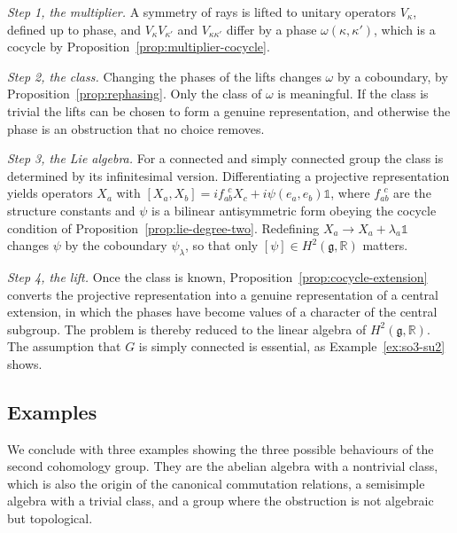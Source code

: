 \begin{remark}\label{rem:bargmann-reading}
	\emph{Step 1, the multiplier.} A symmetry of rays is lifted to unitary operators $V_\kappa$, defined up to phase, and $V_\kappa V_{\kappa'}$ and $V_{\kappa\kappa'}$ differ by a phase $\omega(\kappa,\kappa')$, which is a cocycle by Proposition~\ref{prop:multiplier-cocycle}.
	
	\emph{Step 2, the class.} Changing the phases of the lifts changes $\omega$ by a coboundary, by Proposition~\ref{prop:rephasing}. Only the class of $\omega$ is meaningful. If the class is trivial the lifts can be chosen to form a genuine representation, and otherwise the phase is an obstruction that no choice removes.
	
	\emph{Step 3, the Lie algebra.} For a connected and simply connected group the class is determined by its infinitesimal version. Differentiating a projective representation yields operators $X_a$ with $[X_a,X_b]=if_{ab}^{\ \ c}X_c+i\psi(e_a,e_b)\mathbb{1}$, where $f_{ab}^{\ \ c}$ are the structure constants and $\psi$ is a bilinear antisymmetric form obeying the cocycle condition of Proposition~\ref{prop:lie-degree-two}. Redefining $X_a\to X_a+\lambda_a\mathbb{1}$ changes $\psi$ by the coboundary $\psi_\lambda$, so that only $[\psi]\in H^2(\mathfrak{g},\mathbb{R})$ matters.
	
	\emph{Step 4, the lift.} Once the class is known, Proposition~\ref{prop:cocycle-extension} converts the projective representation into a genuine representation of a central extension, in which the phases have become values of a character of the central subgroup. The problem is thereby reduced to the linear algebra of $H^2(\mathfrak{g},\mathbb{R})$. The assumption that $G$ is simply connected is essential, as Example~\ref{ex:so3-su2} shows.
\end{remark}

\subsection{Examples}\label{subsec:cohomology-examples}

We conclude with three examples showing the three possible behaviours of the second cohomology group. They are the abelian algebra with a nontrivial class, which is also the origin of the canonical commutation relations, a semisimple algebra with a trivial class, and a group where the obstruction is not algebraic but topological.

